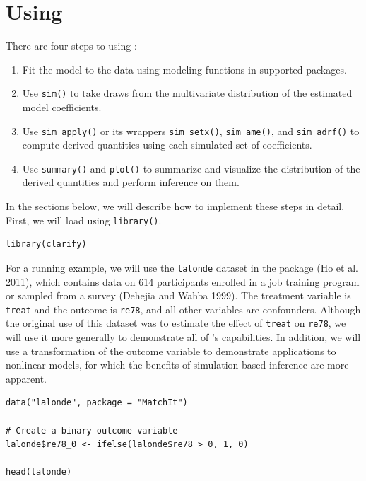 \section{\texorpdfstring{Using }{Using }}\label{using}

There are four steps to using :

\begin{enumerate}
\def\labelenumi{\arabic{enumi}.}
\item
  Fit the model to the data using modeling functions in supported packages.
\item
  Use \texttt{sim()} to take draws from the multivariate distribution of the estimated model coefficients.
\item
  Use \texttt{sim\_apply()} or its wrappers \texttt{sim\_setx()}, \texttt{sim\_ame()}, and \texttt{sim\_adrf()} to compute derived quantities using each simulated set of coefficients.
\item
  Use \texttt{summary()} and \texttt{plot()} to summarize and visualize the distribution of the derived quantities and perform inference on them.
\end{enumerate}

In the sections below, we will describe how to implement these steps in detail. First, we will load  using \texttt{library()}.

\begin{verbatim}
library(clarify)
\end{verbatim}

For a running example, we will use the \texttt{lalonde} dataset in the  package (Ho et al. 2011), which contains data on 614 participants enrolled in a job training program or sampled from a survey (Dehejia and Wahba 1999). The treatment variable is \texttt{treat} and the outcome is \texttt{re78}, and all other variables are confounders. Although the original use of this dataset was to estimate the effect of \texttt{treat} on \texttt{re78}, we will use it more generally to demonstrate all of 's capabilities. In addition, we will use a transformation of the outcome variable to demonstrate applications to nonlinear models, for which the benefits of simulation-based inference are more apparent.

\begin{verbatim}
data("lalonde", package = "MatchIt")

# Create a binary outcome variable
lalonde$re78_0 <- ifelse(lalonde$re78 > 0, 1, 0)

head(lalonde)
\end{verbatim}

